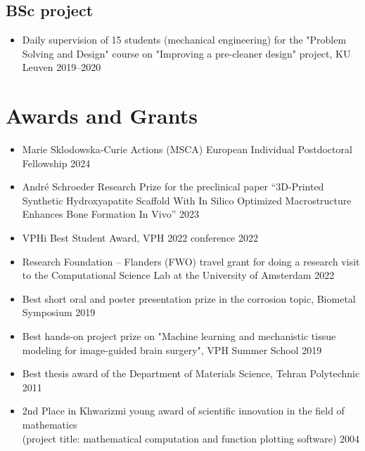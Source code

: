 \documentclass{cv}
\begin{document}
\subsection{BSc project}

\begin{itemize}[itemsep=-0.2ex]
\item
Daily supervision of 15 students (mechanical engineering) for the "Problem Solving and Design" course on "Improving a pre-cleaner design" project, KU Leuven \hfill 2019--2020
\end{itemize}



\section{Awards and Grants}

\begin{itemize}[itemsep=-0.2ex]
\item
Marie Sklodowska-Curie Actions (MSCA) European Individual Postdoctoral Fellowship \hfill 2024
\item
André Schroeder Research Prize for the preclinical paper ``3D-Printed Synthetic Hydroxyapatite Scaffold With In Silico Optimized Macrostructure Enhances Bone Formation In Vivo'' \hfill 2023
\item 
VPHi Best Student Award, VPH 2022 conference \hfill 2022
\item
Research Foundation – Flanders (FWO) travel grant for doing a research visit to the Computational Science Lab at the University of Amsterdam \hfill 2022
\item
Best short oral and poster presentation prize in the corrosion topic, Biometal Symposium \hfill 2019
\item
Best hands-on project prize on "Machine learning and mechanistic tissue modeling for image-guided brain surgery", VPH Summer School \hfill 2019
\item
Best thesis award of the Department of Materials Science, Tehran Polytechnic \hfill 2011
\item
2nd Place in Khwarizmi young award of scientific innovation in the field of mathematics\\(project title: mathematical computation and function plotting software) \hfill 2004
\end{itemize}



\end{document}
